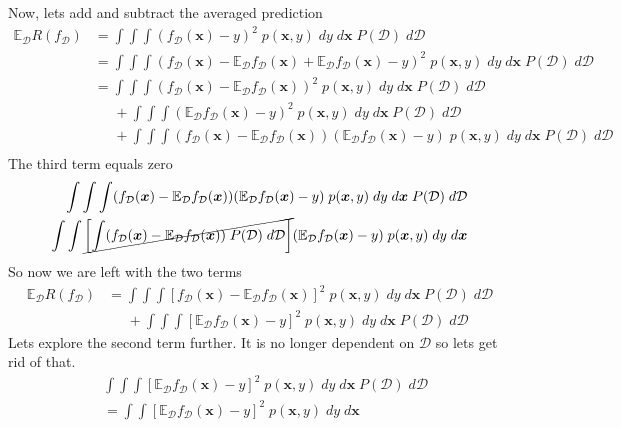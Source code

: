 \documentclass[11pt]{article}
\newcommand{\vct}[1]{\boldsymbol{#1}} %
\newcommand{\ProbOpr}[1]{\mathbb{#1}}
\begin{document}
Now, lets add and subtract the averaged prediction
\begin{align*}
\ProbOpr{E}_{\mathcal{D}} R(f_{\mathcal{D}}) &=  \int \int \int (f_{\mathcal{D}}(\vct{x})-y)^2 \;p(\vct{x},y) \;dy \;d\vct{x}\; P(\mathcal{D})\;d\mathcal{D}\\
&=  \int \int \int (f_{\mathcal{D}}(\vct{x})-\ProbOpr{E}_{\mathcal{D}} f_{\mathcal{D}}(\vct{x})  + \ProbOpr{E}_{\mathcal{D}} f_{\mathcal{D}}(\vct{x}) -y)^2 \;p(\vct{x},y) \;dy \;d\vct{x}\; P(\mathcal{D})\;d\mathcal{D}\\
&=  \int \int \int (f_{\mathcal{D}}(\vct{x})-\ProbOpr{E}_{\mathcal{D}} f_{\mathcal{D}}(\vct{x}))^2 \;p(\vct{x},y) \;dy \;d\vct{x}\; P(\mathcal{D})\;d\mathcal{D}\\
&\;\;\;\;\;+ \int \int \int (\ProbOpr{E}_{\mathcal{D}} f_{\mathcal{D}}(\vct{x}) -y)^2 \;p(\vct{x},y) \;dy \;d\vct{x}\; P(\mathcal{D})\;d\mathcal{D}\\
&\;\;\;\;\;+  \int \int \int (f_{\mathcal{D}}(\vct{x})-\ProbOpr{E}_{\mathcal{D}} f_{\mathcal{D}}(\vct{x}))(\ProbOpr{E}_{\mathcal{D}} f_{\mathcal{D}}(\vct{x}) -y) \;p(\vct{x},y) \;dy \;d\vct{x}\; P(\mathcal{D})\;d\mathcal{D}\\
\end{align*}
The third term equals zero
\begin{align*}
\int \int \int (f_{\mathcal{D}}(\vct{x})-\ProbOpr{E}_{\mathcal{D}} f_{\mathcal{D}}(\vct{x}))(\ProbOpr{E}_{\mathcal{D}} f_{\mathcal{D}}(\vct{x}) -y) \;p(\vct{x},y) \;dy \;d\vct{x}\; P(\mathcal{D})\;d\mathcal{D}\\
\int \int \cancel{\left[ \int (f_{\mathcal{D}}(\vct{x})-\ProbOpr{E}_{\mathcal{D}} f_{\mathcal{D}}(\vct{x})) \; P(\mathcal{D})\;d\mathcal{D}  \right]}(\ProbOpr{E}_{\mathcal{D}} f_{\mathcal{D}}(\vct{x}) -y) \;p(\vct{x},y) \;dy \;d\vct{x}\\
\end{align*}
So now we are left with the two terms
\begin{align*}
\ProbOpr{E}_{\mathcal{D}} R(f_{\mathcal{D}}) &=   \int \int \int [f_{\mathcal{D}}(\vct{x})-\ProbOpr{E}_{\mathcal{D}} f_{\mathcal{D}}(\vct{x})]^2 \;p(\vct{x},y) \;dy \;d\vct{x}\; P(\mathcal{D})\;d\mathcal{D}\\
&\;\;\;\;\;+ \int \int \int [\ProbOpr{E}_{\mathcal{D}} f_{\mathcal{D}}(\vct{x}) -y]^2 \;p(\vct{x},y) \;dy \;d\vct{x}\; P(\mathcal{D})\;d\mathcal{D}
\end{align*}
Lets explore the second term further. It is no longer dependent on $\mathcal{D}$ so lets get rid of that.
\begin{align*}
&\int \int \int [\ProbOpr{E}_{\mathcal{D}} f_{\mathcal{D}}(\vct{x}) -y]^2 \;p(\vct{x},y) \;dy \;d\vct{x}\; P(\mathcal{D})\;d\mathcal{D}\\
&=\int \int  [\ProbOpr{E}_{\mathcal{D}} f_{\mathcal{D}}(\vct{x}) -y]^2 \;p(\vct{x},y) \;dy \;d\vct{x}
\end{align*}
\end{document}
